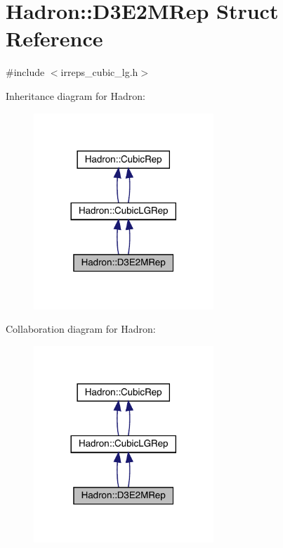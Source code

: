 \hypertarget{structHadron_1_1D3E2MRep}{}\section{Hadron\+:\+:D3\+E2\+M\+Rep Struct Reference}
\label{structHadron_1_1D3E2MRep}


{\ttfamily \#include $<$irreps\+\_\+cubic\+\_\+lg.\+h$>$}



Inheritance diagram for Hadron\+:\nopagebreak
\begin{figure}[H]
\begin{center}
\leavevmode
\includegraphics[width=192pt]{d2/d04/structHadron_1_1D3E2MRep__inherit__graph}
\end{center}
\end{figure}


Collaboration diagram for Hadron\+:\nopagebreak
\begin{figure}[H]
\begin{center}
\leavevmode
\includegraphics[width=192pt]{db/d4d/structHadron_1_1D3E2MRep__coll__graph}
\end{center}
\end{figure}
